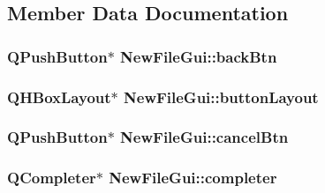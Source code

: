 \subsection{Member Data Documentation}
\hypertarget{class_new_file_gui_a795eb9a1d91260f9f99b15b8544e71e6}{
\subsubsection[{back\-Btn}]{\setlength{\rightskip}{0pt plus 5cm}Q\-Push\-Button$\ast$ New\-File\-Gui\-::back\-Btn\hspace{0.3cm}{\ttfamily [private]}}}\label{class_new_file_gui_a795eb9a1d91260f9f99b15b8544e71e6}
\hypertarget{class_new_file_gui_aec890bfe56498ad4c1e3865387f147b5}{
\subsubsection[{button\-Layout}]{\setlength{\rightskip}{0pt plus 5cm}Q\-H\-Box\-Layout$\ast$ New\-File\-Gui\-::button\-Layout\hspace{0.3cm}{\ttfamily [private]}}}\label{class_new_file_gui_aec890bfe56498ad4c1e3865387f147b5}
\hypertarget{class_new_file_gui_a5be4525cfa97c2ec799a7357eb6a1fb4}{
\subsubsection[{cancel\-Btn}]{\setlength{\rightskip}{0pt plus 5cm}Q\-Push\-Button$\ast$ New\-File\-Gui\-::cancel\-Btn\hspace{0.3cm}{\ttfamily [private]}}}\label{class_new_file_gui_a5be4525cfa97c2ec799a7357eb6a1fb4}
\hypertarget{class_new_file_gui_a5c8508fb9dba194838e0cfce4d6f7988}{
\subsubsection[{completer}]{\setlength{\rightskip}{0pt plus 5cm}Q\-Completer$\ast$ New\-File\-Gui\-::completer\hspace{0.3cm}{\ttfamily [private]}}}\label{class_new_file_gui_a5c8508fb9dba194838e0cfce4d6f7988}
